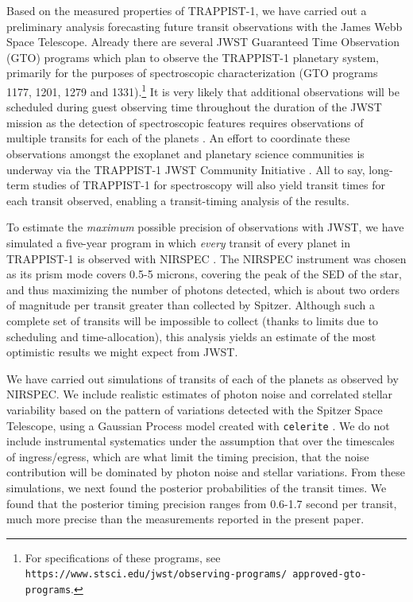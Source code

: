 \documentclass[twocolumn]{aastex63}
\begin{document}
Based on the measured properties of TRAPPIST-1, we have carried out a preliminary analysis forecasting future transit observations with the James Webb Space Telescope. Already there are several JWST Guaranteed Time Observation (GTO) programs which plan to observe the TRAPPIST-1 planetary system, primarily for the purposes of spectroscopic characterization (GTO programs 1177, 1201, 1279 and 1331).\footnote{For specifications of these programs, see \texttt{https://www.stsci.edu/jwst/observing-programs/ approved-gto-programs}.}  It is very likely that additional observations will be scheduled during guest observing  time throughout the duration of the JWST mission as the detection of spectroscopic features requires observations of multiple transits for each of the planets \citep{Morley2017,Barstow2016,Lustig-Yaeger2019,Fauchez2020b}.   An effort to coordinate these observations amongst the exoplanet and planetary science communities is underway via the TRAPPIST-1 JWST Community Initiative \citep{Gillon2020}.  All to say, long-term studies of TRAPPIST-1 for spectroscopy will also yield transit times for each transit observed, enabling a transit-timing analysis of the results.

To estimate the {\it maximum} possible precision of observations with JWST, we have simulated a five-year program in which {\it every} transit of every planet in TRAPPIST-1 is observed with NIRSPEC \citep{Birkmann2016}.   The NIRSPEC instrument was chosen as its prism mode covers 0.5-5 microns, covering the peak of the SED of the star, and thus maximizing the number of photons detected, which is about two orders of magnitude per transit greater than collected by Spitzer. Although such a complete set of transits will be impossible to collect (thanks to limits due to scheduling and time-allocation), this analysis yields an estimate of the most optimistic results we might expect from JWST.

We have carried out simulations of transits of each of the planets as observed by NIRSPEC.  We include realistic estimates of photon noise and correlated stellar variability based on the pattern of variations detected with the Spitzer Space Telescope, using a Gaussian Process model created with \texttt{celerite} \citep{ForemanMackey2017}.  We do not include instrumental systematics under the assumption that over the timescales of ingress/egress, which are what limit the timing precision, that the noise contribution will be dominated by photon noise and stellar variations.
From these simulations, we
next found the posterior probabilities of the transit times.   We found that the posterior timing precision ranges from 0.6-1.7 second per transit, much more precise than the measurements reported in the present paper.
\end{document}
